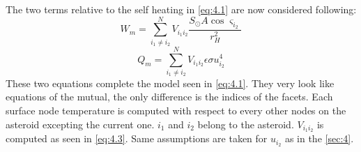 The two terms relative to the self heating in \autoref{eq:4.1} are now considered following:
\begin{equation}
    W_m=\sum_{i_1\neq i_2}^N V_{i_1i_2}\frac{S_{\odot}A\cos\varsigma_{i_2}}{r_H^2}
    \label{eq:5.1}
\end{equation}
\begin{equation}
    Q_m=\sum_{i_1\neq i_2}^N V_{i_1i_2}\epsilon\sigma u_{i_2}^4
    \label{eq:5.2}
\end{equation}
These two equations complete the model seen in \autoref{eq:4.1}. They very look like equations of the mutual, the only difference is the indices of the facets. Each surface node temperature is computed with respect to every other nodes on the asteroid excepting the current one. $i_1$ and $i_2$ belong to the asteroid. $V_{i_1i_2}$ is computed as seen in \autoref{eq:4.3}. Same assumptions are taken for $u_{i_2}$ as in the \autoref{sec:4}.


